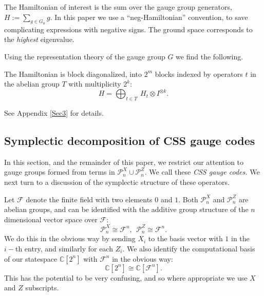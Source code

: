 \documentclass[11pt,oneside]{article}
\def\Complex{\mathbb{C}}
\def\R{\mathbb{R}}
\def\Ham{H}
\def\Pauli{\mathcal{P}}
\newcommand{\Field}{\mathcal{F}}
\def\Fn{\Field^n}
\renewenvironment{framed}
{\begin{samepage}
\MakeFramed{\hsize0.8\linewidth\advance\hsize-\width\FrameRestore}}
{\endMakeFramed\end{samepage}}
\begin{document}
The Hamiltonian of interest is 
the sum over the gauge group generators,
$ \Ham := \sum_{g\in G_0} g.$
In this paper we use a ``neg-Hamiltonian'' convention,
to save complicating expressions with negative signs.
The ground space corresponds to the \emph{highest} eigenvalue.


Using the representation theory of the gauge group $G$
we find the following. 
\begin{framed}
\noindent
The Hamiltonian is block diagonalized, 
into $2^m$ blocks
indexed by operators $t$ in the abelian group $T$ with multiplicity $2^k:$
$$
    \Ham =  \bigoplus_{t\in T}\ \Ham_t \otimes I^{\otimes k}.
$$
\end{framed}
See Appendix \ref{Sec3} for details.


\subsection{Symplectic decomposition of CSS gauge codes}%


In this section, and the remainder of this paper,
we restrict our
attention to gauge groups formed from terms 
in $\Pauli_n^X\cup\Pauli_n^Z.$
We call these \emph{CSS gauge codes.}
We next turn to a discussion of the symplectic structure of
these operators.

Let $\Field$ denote the finite field with two elements $0$ and $1$.
Both $\Pauli^X_n$ and $\Pauli^Z_n$ are abelian groups,
and can be identified with the additive 
group structure of the $n$ dimensional vector space
over $\Field:$
$$
    \Pauli^X_n \cong \Fn,  \ \ 
    \Pauli^Z_n \cong \Fn. 
$$
We do this in the obvious way by sending $X_i$ to the basis vector with
$1$ in the $i-$th entry, and similarly for each $Z_i$. 
We also identify the computational basis of our statespace $\Complex[2^n]$
with $\Fn$ in the obvious way:
$$
\Complex[2^n] \cong \Complex[\Fn].
$$
This has the potential to be very confusing, and
so where appropriate we use $X$ and $Z$ subscripts.
\end{document}
